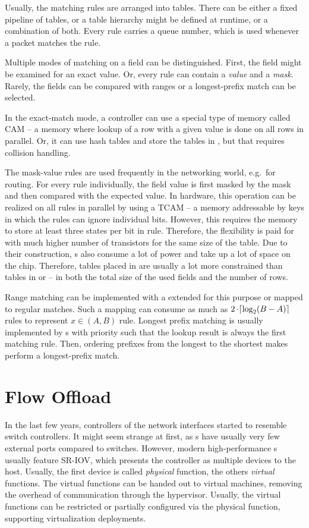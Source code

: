 Usually, the matching rules are arranged into tables. There can be either a fixed pipeline of
tables, or a table hierarchy might be defined at runtime, or a combination of
both. Every rule carries a queue number, which is used whenever a packet
matches the rule.

Multiple modes of matching on a field can be distinguished. First, the field
might be examined for an exact value. Or, every rule can contain a \emph{value}
and a \emph{mask}. Rarely, the fields can be compared with ranges or
a longest-prefix match can be selected.

In the exact-match mode, a controller can use a special type of memory called
\acrfull{CAM} -- a memory where lookup of a row with a given value is done on all
rows in parallel. Or, it can use hash tables and store the tables in ,
but that requires collision handling.

The mask-value rules are used frequently in the networking world, e.g.\ for routing. For every rule
individually, the field value is first masked by the mask and then compared
with the expected value. In hardware, this operation can be realized on all
rules in parallel by using a \acrfull{TCAM} -- a memory addressable by keys in which
the rules can ignore individual bits. However, this requires the memory to store at
least three states per bit in rule. Therefore, the flexibility is paid for with
much higher number of transistors for the same size of the table. Due to their
construction, s also consume a lot of power and take up a lot of space
on the chip. Therefore, tables placed in  are usually a lot more
constrained than tables in  or  -- in both the total size of the
used fields and the number of rows.

Range matching can be implemented with a  extended for this purpose
or mapped to regular  matches. Such a mapping can consume as much as $2
\mathop{\cdot} \lceil \log_2 (B - A) \rceil$  rules to represent $x \in (A,
B)$ rule. Longest prefix matching is usually implemented by s with
priority such that the lookup result is always the first matching rule. Then,
ordering prefixes from the longest to the shortest makes  perform
a longest-prefix match.

\section{Flow Offload}
\label{offload:flow}

In the last few years, controllers of the network interfaces started to resemble
switch controllers. It might seem strange at first, as s have usually
very few external ports compared to switches. However, modern high-performance
s usually feature \acrfull{SR-IOV}, which presents the controller as
multiple  devices to the host. Usually, the first device is called
\emph{physical} function, the others \emph{virtual} functions. The virtual
functions can be handed out to virtual machines, removing the overhead of
communication through the hypervisor. Usually, the virtual functions can be
restricted or partially configured via the physical function, supporting
virtualization deployments.

